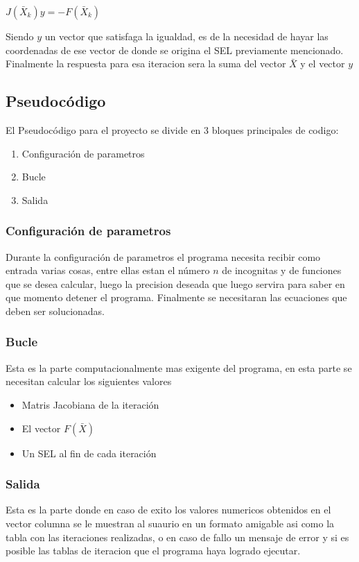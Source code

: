 \documentclass[11pt]{article}
\begin{document}
\begin{center}
$J(\bar{X}_{k})y = -F(\bar{X}_{k}) $
\end{center}

Siendo $y$ un vector que satisfaga la igualdad, es de la necesidad de hayar las coordenadas de ese vector de donde se origina el SEL previamente mencionado. Finalmente la respuesta para esa iteracion sera la suma del vector $\bar{X}$ y el vector $y$


\subsection{Pseudocódigo}
El Pseudocódigo para el proyecto se divide en 3 bloques principales de codigo:
\begin{enumerate}
  \item Configuración de parametros
  \item Bucle
  \item Salida
\end{enumerate}

\subsubsection{Configuración de parametros}
Durante la configuración de parametros el programa necesita recibir como entrada varias cosas, entre ellas estan el número  $n$ de incognitas y de funciones que se desea calcular, luego la precision deseada que luego servira para saber en que momento detener el programa. Finalmente se necesitaran las ecuaciones que deben ser solucionadas.

\subsubsection{Bucle}
Esta es la parte computacionalmente mas exigente del programa, en esta parte se necesitan calcular los siguientes valores
\begin{itemize}
  \item Matris Jacobiana de la iteración
  \item El vector $F(\bar{X})$
  \item Un SEL al fin de cada iteración
\end{itemize}
\subsubsection{Salida}
Esta es la parte donde en caso de exito los valores numericos obtenidos en el vector columna se le muestran al suaurio en un formato amigable asi como la tabla con las iteraciones realizadas, o en caso de fallo un mensaje de error y si es posible las tablas de iteracion que el programa haya logrado ejecutar.  
\clearpage

\nocite{*}

\end{document}
